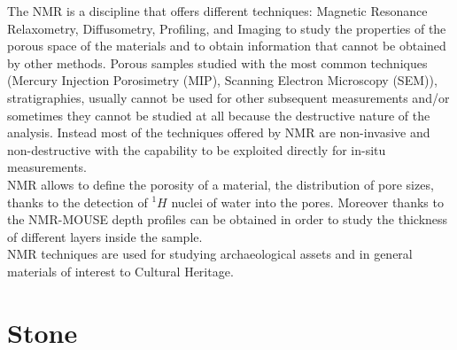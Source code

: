\documentclass[a4paper,11pt]{report}
\begin{document}
The NMR is a discipline that offers different techniques: Magnetic Resonance Relaxometry, Diffusometry, Profiling, and Imaging to study the properties of the porous space of the materials and to obtain information that cannot be obtained by other methods.
Porous samples studied with the most common techniques (Mercury Injection Porosimetry (MIP), Scanning Electron Microscopy (SEM)), stratigraphies, usually cannot be used for other subsequent measurements and/or sometimes they cannot be studied at all because the destructive nature of the analysis. Instead most of the techniques offered by NMR are non-invasive and non-destructive  with the capability to be exploited directly for in-situ measurements.\\
NMR allows to define the porosity of a material, the distribution of pore sizes, thanks to the detection of $^1H$ nuclei of water into the pores. Moreover thanks to the NMR-MOUSE depth profiles can be obtained in order to study the thickness of different layers inside the sample.\\
NMR techniques are used for studying archaeological assets and in general materials of interest to Cultural Heritage.

\section{Stone}
\end{document}
